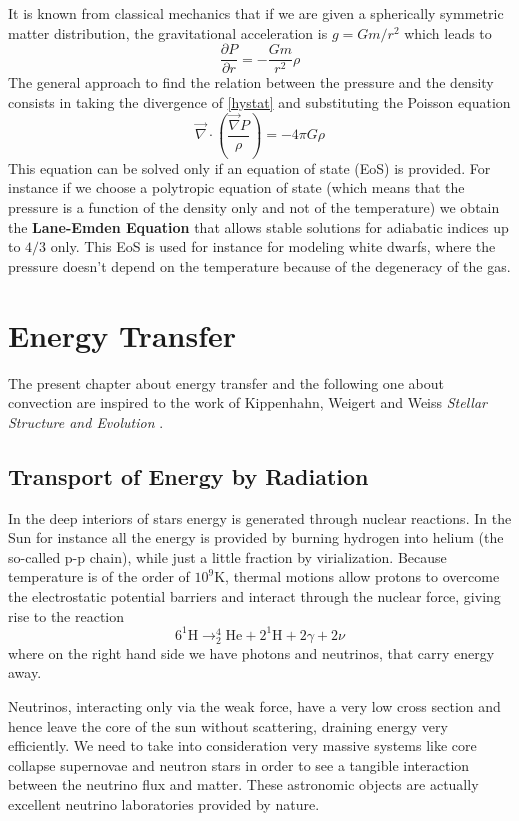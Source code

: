 It is known from classical mechanics that if we are given a spherically symmetric matter distribution, the gravitational acceleration is $g=Gm/r^2$ which leads to
\begin{equation}\label{HydroEquilibrium}
	\frac{\partial P}{\partial r}= - \frac{G m}{r^2} \rho
\end{equation}
The general approach to find the relation between the pressure and the density consists in taking the divergence of \ref{hystat} and substituting the Poisson equation 
$$
\vec \nabla \cdot \left ( \frac{\vec \nabla P}{\rho} \right ) = - 4 \pi G \rho 
$$
This equation can be solved only if an equation of state (EoS) is provided. For instance if we choose a polytropic equation of state (which means that the pressure is a function of the density only and not of the temperature) we obtain the \textbf{Lane-Emden Equation} that allows stable solutions for adiabatic indices up to $4/3$ only. This EoS is used for instance for modeling white dwarfs, where the pressure doesn't depend on the temperature because of the degeneracy of the gas. 

\section{Energy Transfer}
	The present chapter about energy transfer and the following one about convection are inspired to the work of Kippenhahn, Weigert and Weiss \textit{Stellar Structure and Evolution} \cite{stellarstruc}.
\subsection{Transport of Energy by Radiation}
In the deep interiors of stars energy is generated through nuclear reactions. In the Sun for instance all the energy is provided by burning hydrogen into helium (the so-called p-p chain), while just a little fraction by virialization. Because temperature is of the order of $10^9 \mathrm{K}$, thermal motions allow protons to overcome the electrostatic potential barriers and interact through the nuclear force, giving rise to the reaction
\begin{equation}\label{ppchain}
	6 ^1\mathrm{H} \to ^4_2\mathrm{He} + 2 ^1\mathrm{H} + 2 \gamma + 2 \nu
\end{equation}
where on the right hand side we have photons and neutrinos, that carry energy away. 

Neutrinos, interacting only via the weak force, have a very low cross section and hence leave the core of the sun without scattering, draining energy very efficiently. We need to take into consideration very massive systems like core collapse supernovae and neutron stars in order to see a tangible interaction between the neutrino flux and matter. These astronomic objects are actually excellent neutrino laboratories provided by nature. 


